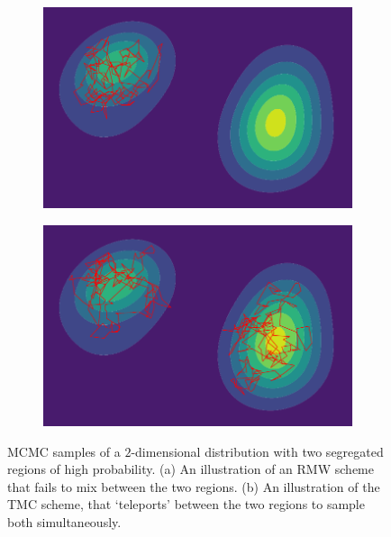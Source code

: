 \begin{figure} 
    \centering
    \begin{subfigure}[b]{0.47\textwidth}  
        \centering 
        \includegraphics[width=\textwidth]{figs_part1/mcmc/example_2D_dist_with_RMW}
        \caption[]%
        {}    
        \label{fig:example_2D_dist_with_RMW}
    \end{subfigure}
    \hfill
    \begin{subfigure}[b]{0.47\textwidth}
        \centering
        \includegraphics[width=\textwidth]{figs_part1/mcmc/example_2D_dist_with_TMC}
        \caption[]%
        {}    
        \label{fig:example_2D_dist_with_TMC}
    \end{subfigure}
    \caption[ ]
    {\small MCMC samples of a $2$-dimensional distribution with two segregated regions of high probability. (a) An illustration of an RMW scheme that fails to mix between the two regions. (b) An illustration of the TMC scheme, that `teleports' between the two regions to sample both simultaneously. }
\end{figure} 

